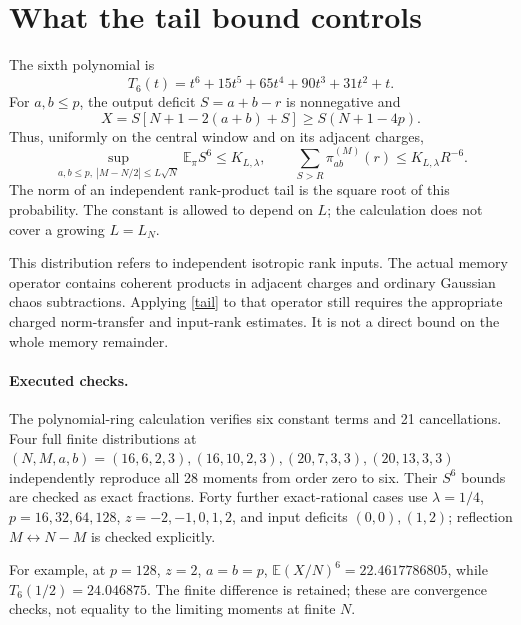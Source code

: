 \documentclass[11pt,a4paper]{article}
\newcommand{\EE}{\mathbb E}
\begin{document}
\newpage
\section{What the tail bound controls}
The sixth polynomial is
\begin{equation}
 T_6(t)=t^6+15t^5+65t^4+90t^3+31t^2+t.
\end{equation}
For $a,b\le p$, the output deficit $S=a+b-r$ is nonnegative and
\begin{equation}
 X=S[N+1-2(a+b)+S]\ge S(N+1-4p).
\end{equation}
Thus, uniformly on the central window and on its adjacent charges,
\begin{equation}
 \sup_{a,b\le p,\ |M-N/2|\le L\sqrt N}\EE_\pi S^6
 \le K_{L,\lambda},\qquad
 \sum_{S>R}\pi_{ab}^{(M)}(r)\le K_{L,\lambda}R^{-6}.
 \label{tail}
\end{equation}
The norm of an independent rank-product tail is the square root
of this probability. The constant is allowed to depend on $L$;
the calculation does not cover a growing $L=L_N$.

This distribution refers to independent isotropic rank inputs.
The actual memory operator contains coherent products in adjacent
charges and ordinary Gaussian chaos subtractions. Applying
\eqref{tail} to that operator still requires the appropriate
charged norm-transfer and input-rank estimates. It is not a direct
bound on the whole memory remainder.

\paragraph{Executed checks.}
The polynomial-ring calculation verifies six constant terms and
21 cancellations. Four full finite distributions at
$(N,M,a,b)=(16,6,2,3),(16,10,2,3),(20,7,3,3),(20,13,3,3)$
independently reproduce all 28 moments from order zero to six.
Their $S^6$ bounds are checked as exact fractions. Forty further
exact-rational cases use $\lambda=1/4$, $p=16,32,64,128$,
$z=-2,-1,0,1,2$, and input deficits $(0,0),(1,2)$; reflection
$M\leftrightarrow N-M$ is checked explicitly.

For example, at $p=128$, $z=2$, $a=b=p$,
$\EE(X/N)^6=22.4617786805$, while $T_6(1/2)=24.046875$.
The finite difference is retained; these are convergence checks,
not equality to the limiting moments at finite $N$.

\newpage
\end{document}
